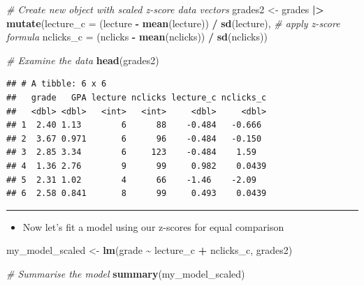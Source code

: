 \documentclass[
]{article}
\newenvironment{Shaded}{\begin{snugshade}}{\end{snugshade}}
\newcommand{\AttributeTok}[1]{\textcolor[rgb]{0.13,0.29,0.53}{#1}}
\newcommand{\CommentTok}[1]{\textcolor[rgb]{0.56,0.35,0.01}{\textit{#1}}}
\newcommand{\FunctionTok}[1]{\textcolor[rgb]{0.13,0.29,0.53}{\textbf{#1}}}
\newcommand{\NormalTok}[1]{#1}
\newcommand{\OtherTok}[1]{\textcolor[rgb]{0.56,0.35,0.01}{#1}}
\newcommand{\SpecialCharTok}[1]{\textcolor[rgb]{0.81,0.36,0.00}{\textbf{#1}}}
\providecommand{\tightlist}{%
  \setlength{\itemsep}{0pt}\setlength{\parskip}{0pt}}
\begin{document}
\begin{Shaded}
\begin{Highlighting}[]
\CommentTok{\# Create new object with scaled z{-}score data vectors}
\NormalTok{grades2 }\OtherTok{\textless{}{-}} 
\NormalTok{  grades }\SpecialCharTok{|\textgreater{}}
  \FunctionTok{mutate}\NormalTok{(}\AttributeTok{lecture\_c =} 
\NormalTok{           (lecture }\SpecialCharTok{{-}} \FunctionTok{mean}\NormalTok{(lecture)) }\SpecialCharTok{/} \FunctionTok{sd}\NormalTok{(lecture), }\CommentTok{\# apply z{-}score formula}
         \AttributeTok{nclicks\_c =} 
\NormalTok{           (nclicks }\SpecialCharTok{{-}} \FunctionTok{mean}\NormalTok{(nclicks)) }\SpecialCharTok{/} \FunctionTok{sd}\NormalTok{(nclicks))}

\CommentTok{\# Examine the data}
\FunctionTok{head}\NormalTok{(grades2)}
\end{Highlighting}
\end{Shaded}

\begin{verbatim}
## # A tibble: 6 x 6
##   grade   GPA lecture nclicks lecture_c nclicks_c
##   <dbl> <dbl>   <int>   <int>     <dbl>     <dbl>
## 1  2.40 1.13        6      88    -0.484   -0.666 
## 2  3.67 0.971       6      96    -0.484   -0.150 
## 3  2.85 3.34        6     123    -0.484    1.59  
## 4  1.36 2.76        9      99     0.982    0.0439
## 5  2.31 1.02        4      66    -1.46    -2.09  
## 6  2.58 0.841       8      99     0.493    0.0439
\end{verbatim}

\begin{center}\rule{0.5\linewidth}{0.5pt}\end{center}

\begin{itemize}
\tightlist
\item
  Now let's fit a model using our z-scores for equal comparison
\end{itemize}

\begin{Shaded}
\begin{Highlighting}[]
\NormalTok{my\_model\_scaled }\OtherTok{\textless{}{-}} 
  \FunctionTok{lm}\NormalTok{(grade }\SpecialCharTok{\textasciitilde{}}\NormalTok{ lecture\_c }\SpecialCharTok{+}\NormalTok{ nclicks\_c, }
\NormalTok{     grades2)}

\CommentTok{\# Summarise the model}
\FunctionTok{summary}\NormalTok{(my\_model\_scaled)}
\end{Highlighting}
\end{Shaded}
\end{document}
